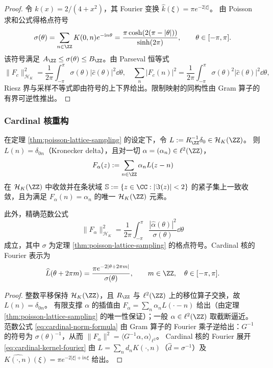 \begin{proof}
令 \(k(x)=2/(4+x^2)\)，其 Fourier 变换 \(\widehat{k}(\xi)=\pi e^{-2|\xi|}\)。
由 Poisson 求和公式得格点符号
\[
\sigma(\theta)
=\sum_{n\in\ZZ}K(0,n)e^{-\mathrm{i}n\theta}
=\frac{\pi\cosh(2(\pi-|\theta|))}{\sinh(2\pi)},
\qquad \theta\in[-\pi,\pi].
\]
该符号满足 \(A_{\ZZ}\le\sigma(\theta)\le B_{\ZZ}\)。由 Parseval 恒等式
\[
\|F_c\|_{\mathcal{H}_K}^2
=\frac{1}{2\pi}\int_{-\pi}^{\pi}\sigma(\theta)|\widehat{c}(\theta)|^2\dd\theta,
\quad
\sum_{n}|F_c(n)|^2
=\frac{1}{2\pi}\int_{-\pi}^{\pi}\sigma(\theta)^2|\widehat{c}(\theta)|^2\dd\theta,
\]
Riesz 界与采样不等式即由符号的上下界给出。限制映射的同构性由 Gram 算子的有界可逆性推出。
\end{proof}

\subsubsection{Cardinal 核重构}


\begin{theorem}\label{thm:poisson-cardinal-reconstruction}
在定理 \ref{thm:poisson-lattice-sampling} 的设定下，令 \(L:=R_{\ZZ}^{-1}\delta_0\in\mathcal{H}_K(\ZZ)\)。
则 \(L(n)=\delta_{0n}\)（Kronecker delta），且对一切 \(\alpha=(\alpha_n)\in\ell^2(\ZZ)\)，
\[
F_\alpha(z):=\sum_{n\in\ZZ}\alpha_n L(z-n)
\]
在 \(\mathcal{H}_K(\ZZ)\) 中收敛并在条状域 \(\mathbb{S}:=\{z\in\CC:|\Im(z)|<2\}\) 的紧子集上一致收敛，且为满足 \(F_\alpha(n)=\alpha_n\) 的唯一 \(\mathcal{H}_K(\ZZ)\) 元素。

此外，精确范数公式
\begin{equation}\label{eq:cardinal-norm-formula}
\|F_\alpha\|_{\mathcal{H}_K}^2
=\frac{1}{2\pi}\int_{-\pi}^{\pi}
\frac{|\widehat\alpha(\theta)|^2}{\sigma(\theta)}\dd\theta
\end{equation}
成立，其中 \(\sigma\) 为定理 \ref{thm:poisson-lattice-sampling} 的格点符号。Cardinal 核的 Fourier 表示为
\begin{equation}\label{eq:cardinal-kernel-fourier}
\widehat{L}(\theta+2\pi m)
=\frac{\pi e^{-2|\theta+2\pi m|}}{\sigma(\theta)},
\qquad m\in\ZZ,\quad \theta\in[-\pi,\pi].
\end{equation}
\end{theorem}

\begin{proof}
整数平移保持 \(\mathcal{H}_K(\ZZ)\)，且 \(R_{\ZZ}\) 与 \(\ell^2(\ZZ)\) 上的移位算子交换，故 \(L(n)=\delta_{0n}\)。
有限支撑 \(\alpha\) 的插值由 \(F_\alpha=\sum_n\alpha_n L(\cdot-n)\) 给出（由定理 \ref{thm:poisson-lattice-sampling} 的唯一性保证）；一般 \(\alpha\in\ell^2(\ZZ)\) 取截断逼近。
范数公式 \eqref{eq:cardinal-norm-formula} 由 Gram 算子的 Fourier 乘子逆给出：\(G^{-1}\) 的符号为 \(\sigma(\theta)^{-1}\)，从而 \(\|F_\alpha\|^2=\langle G^{-1}\alpha,\alpha\rangle_{\ell^2}\)。
Cardinal 核的 Fourier 展开 \eqref{eq:cardinal-kernel-fourier} 由 \(L=\sum_n d_n K(\cdot,n)\)（\(\widehat{d}=\sigma^{-1}\)）及 \(\widehat{K(\cdot,n)}(\xi)=\pi e^{-2|\xi|+\mathrm{i}n\xi}\) 给出。
\end{proof}
